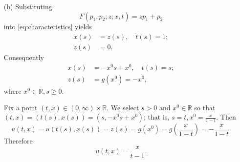 \begin{sol}
\begin{itemize}
  \item[(b) ]
  Substituting
  \begin{displaymath}
    F(p_1, p_2; z; x, t) = zp_1 + p_2
  \end{displaymath}
  into \eqref{eq:characteristics} yields
  \begin{align*}
    \dot{x}(s) &= z(s), \quad \dot{t}(s) = 1; \\
    \dot{z}(s) &= 0.
  \end{align*}
  Consequently
  \begin{align*}
    x(s) &= -x^0s + x^0, \quad t(s) = s; \\
    z(s) &= g(x^0) = -x^0,
  \end{align*}
  where $x^0\in\mathbb{R}, s\geq 0$.

  Fix a point $(t, x)\in(0, \infty)\times\mathbb{R}$.
  We select $s>0$ and $x^0\in\mathbb{R}$ so that
  $(t, x) = (t(s), x(s)) = (s, -x^0s+x^0)$;
  that is,
  $s = t, x^0 = \frac{x}{1-t}$.
  Then
  \begin{displaymath}
    u(t, x) = u(t(s), x(s)) = z(s) = g(x^0)= g\left(\frac{x}{1-t}\right) =
    -\frac{x}{1-t}.
  \end{displaymath}
  Therefore
  \begin{equation}
    u(t, x) = \frac{x}{t-1}.
  \end{equation}
\end{itemize}
\end{sol}
